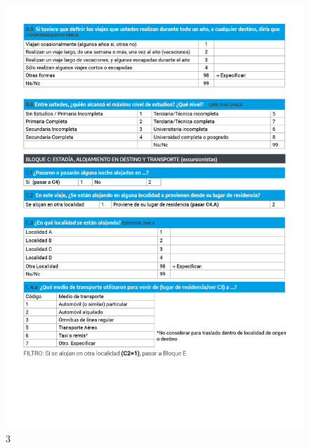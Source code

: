 \documentclass[
]{book}
\begin{document}
\begin{figure}
\includegraphics[width=17.22in]{imagenes/graf03} \caption{3}\label{fig:003}
\end{figure}
\end{document}

